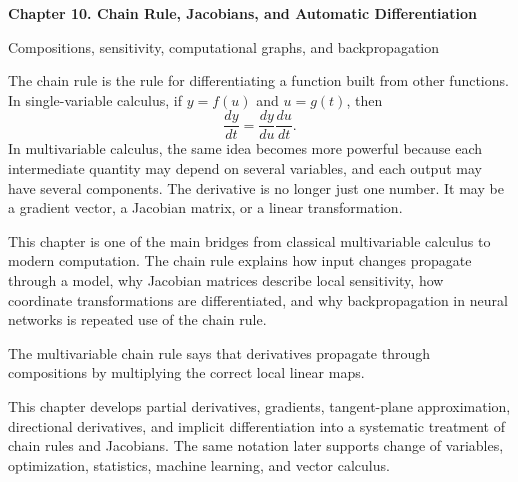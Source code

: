 \documentclass[11pt]{article}
\begin{document}
\begin{center}
  {\LARGE\bfseries Chapter 10. Chain Rule, Jacobians, and Automatic Differentiation\par}
  \vspace{0.3em}
  {\large Compositions, sensitivity, computational graphs, and backpropagation\par}
\end{center}

\begin{chapteroverviewbox}
The chain rule is the rule for differentiating a function built from other functions. In single-variable calculus, if $y=f(u)$ and $u=g(t)$, then
\[
\frac{dy}{dt}=\frac{dy}{du}\frac{du}{dt}.
\]
In multivariable calculus, the same idea becomes more powerful because each intermediate quantity may depend on several variables, and each output may have several components. The derivative is no longer just one number. It may be a gradient vector, a Jacobian matrix, or a linear transformation.

This chapter is one of the main bridges from classical multivariable calculus to modern computation. The chain rule explains how input changes propagate through a model, why Jacobian matrices describe local sensitivity, how coordinate transformations are differentiated, and why backpropagation in neural networks is repeated use of the chain rule.
\end{chapteroverviewbox}

\begin{importantbox}
The multivariable chain rule says that derivatives propagate through compositions by multiplying the correct local linear maps.
\end{importantbox}

\begin{notebox}
This chapter develops partial derivatives, gradients, tangent-plane approximation, directional derivatives, and implicit differentiation into a systematic treatment of chain rules and Jacobians. The same notation later supports change of variables, optimization, statistics, machine learning, and vector calculus.
\end{notebox}
\end{document}

